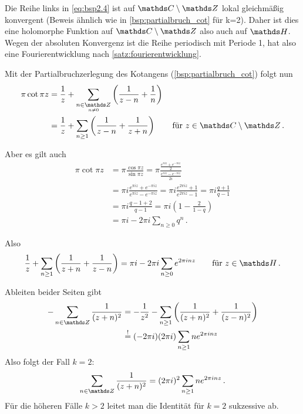 \begin{bewe}
Die Reihe links in \eqref{eq:bsp2.4} ist auf $\CC\setminus\ZZ$ lokal gleichmäßig konvergent (Beweis ähnlich wie in \autoref{bsp:partialbruch_cot} für k=2). Daher ist dies eine holomorphe Funktion auf $\CC\setminus\ZZ$ also auch auf $\HH$. Wegen der absoluten Konvergenz ist die Reihe periodisch mit Periode 1, hat also eine Fourierentwicklung nach \autoref{satz:fourierentwicklung}.

Mit der Partialbruchzerlegung des Kotangens (\autoref{bsp:partialbruch_cot}) folgt nun
\begin{align*}
	\pi\cot \pi z
	&= \frac{1}{z} + \sum_{\substack{n\in\ZZ \\ \scriptscriptstyle n\not=0}} \left(\frac{1}{z-n} + \frac{1}{n}\right) \\
	&= \frac{1}{z} + \sum_{n\geq 1} \left(\frac{1}{z-n} + \frac{1}{z+n}\right)
	\qquad \text{für } z \in \CC\setminus\ZZ
	\,.
\end{align*}

Aber es gilt auch
\begin{align*}
	\pi \cot \pi z
	&= \pi \frac{\cos \pi z}{\sin \pi z}
	= \pi \frac{\frac{e^{\pi iz}+e^{-\pi iz}}{2}}{\frac{e^{\pi iz} - e^{-\pi iz}}{2i}} \\
	&= \pi i \frac{e^{\pi iz}+e^{-\pi iz}}{e^{\pi iz} - e^{-\pi iz}}
	= \pi i \frac{e^{2\pi iz}+1}{e^{2\pi iz}-1}
	= \pi i \frac{q+1}{q-1} \\
	&= \pi i \frac{q-1+2}{q-1}
	= \pi i \left(1-\frac{2}{1-q}\right)  \\
	&= \pi i - 2\pi i \sum_{n\geq 0} q^n
	\,.
\end{align*}

Also
\[
	\frac{1}{z} + \sum_{n\geq 1} \left(\frac{1}{z+n} + \frac{1}{z-n}\right)
	= \pi i - 2\pi i \sum_{n\geq 0} e^{2\pi inz}
	\qquad \text{für } z \in \HH
	\,.
\]

Ableiten beider Seiten gibt
\begin{align*}
	-\sum_{n\in\ZZ} \frac{1}{(z+n)^2}
	&= -\frac{1}{z^2} - \sum_{n\geq 1} \left(\frac{1}{(z+n)^2} + \frac{1}{(z-n)^2}\right) \\
	&\mystackrel{!}{=} (-2\pi i)(2\pi i) \sum_{n\geq 1} ne^{2\pi inz}
\end{align*}
Also folgt der Fall $k=2$:
\[
	\sum_{n\in\ZZ} \frac{1}{(z+n)^2}
	= (2\pi i)^2 \sum_{n\geq 1} ne^{2\pi inz}
	\,.
\]
Für die höheren Fälle $k > 2$ leitet man die Identität für $k=2$ sukzessive ab.
\end{bewe}